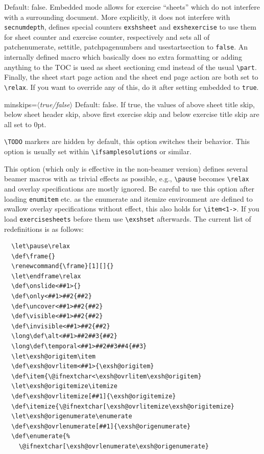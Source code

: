 \documentclass[DIV12,BCOR0mm]{scrartcl}
\newcommand{\param}[1]{$\langle${\normalfont\itshape #1\/}$\rangle$}
\newcommand{\maybe}[1]{\textcolor{green!50!black}{#1}}
\newcommand{\codestyle}{\normalfont\ttfamily\color{blue!50!black}}
\newcommand{\optionstyle}{\normalfont\ttfamily\color{red!50!black}}
\newcommand{\option}[1]{{\optionstyle #1}}
\newcommand{\optitem}[1][]{\item[{\codestyle #1}]}
\begin{document}
\begin{description}
 \optitem[{\option{embedded}\maybe{=\param{true/false}}}] Default: false.
  Embedded mode allows for exercise ``sheets'' which do not
  interfere with a surrounding document. More explicitly, it does
  not interfere with \lstinline|secnumdepth|, defines special counters
  \lstinline|exshsheet| and \lstinline|exshexercise| to use them for
  \option{sheet counter} and \option{exercise counter},
  respectively and sets all of \option{patchenumerate},
  \option{settitle}, \option{patchpagenumbers} and
  \option{usestartsection} to \lstinline|false|.
  An internally defined macro which basically does no extra
  formatting or adding anything to the TOC is used as
  \option{sheet sectioning cmd} instead of the usual \lstinline|\part|.
  Finally,
  the \option{sheet start page action} and the
  \option{sheet end page action} are both set to \lstinline|\relax|.
  If you want to override any of this, do it after setting
  \option{embedded} to \lstinline|true|.
 \item{\option{minskips\maybe{=\param{true/false}}}} Default: false.
  If true, the values of
  \option{above sheet title skip},
  \option{below sheet header skip},
  \option{above first exercise skip} and
  \option{below exercise title skip} are all set to 0pt.
 \optitem[{\option{showtodos} / \option{hidetodos}}]
  \lstinline|\TODO| markers
  are hidden by default, this option switches their behavior. This
  option is usually set within \lstinline|\ifsamplesolutions| or
  similar.
 \optitem[{\option{beamercompatibility}\maybe{=\param{true/false}}}]
  This option (which only is effective in the non-beamer version)
  defines several beamer macros with as trivial
  effects as possible, e.g., \lstinline|\pause| becomes \lstinline|\relax|
  and overlay specifications are mostly ignored. Be careful to use
  this option after loading \lstinline|enumitem| etc. as the enumerate
  and itemize environment are defined to swallow overlay
  specifications without effect, this also holds for
  \lstinline|\item<1->|. If you load \lstinline|exercisesheets| before them
  use \lstinline|\exshset| afterwards.
  The current list of redefinitions is as
  follows:
\begin{lstlisting}
  \let\pause\relax
  \def\frame{}
  \renewcommand{\frame}[1][]{}
  \let\endframe\relax
  \def\onslide<##1>{}
  \def\only<##1>##2{##2}
  \def\uncover<##1>##2{##2}
  \def\visible<##1>##2{##2}
  \def\invisible<##1>##2{##2}
  \long\def\alt<##1>##2##3{##2}
  \long\def\temporal<##1>##2##3##4{##3}
  \let\exsh@origitem\item
  \def\exsh@ovrlitem<##1>{\exsh@origitem}
  \def\item{\@ifnextchar<\exsh@ovrlitem\exsh@origitem}
  \let\exsh@origitemize\itemize
  \def\exsh@ovrlitemize[##1]{\exsh@origitemize}
  \def\itemize{\@ifnextchar[\exsh@ovrlitemize\exsh@origitemize}
  \let\exsh@origenumerate\enumerate
  \def\exsh@ovrlenumerate[##1]{\exsh@origenumerate}
  \def\enumerate{%
    \@ifnextchar[\exsh@ovrlenumerate\exsh@origenumerate}
\end{lstlisting}


\end{description}
\end{document}
